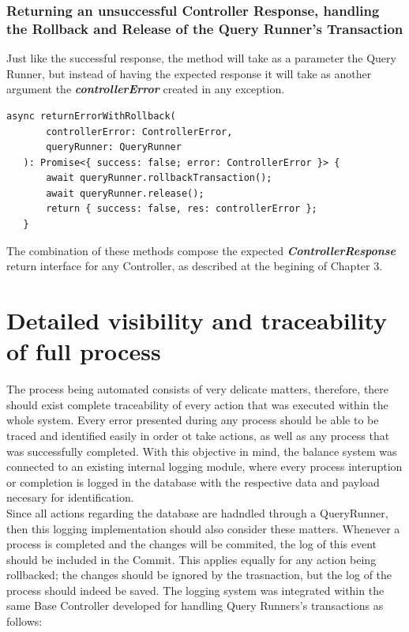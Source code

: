 \subsubsection{Returning an unsuccessful Controller Response, handling the Rollback and Release of the Query Runner's Transaction}


Just like the successful response, the method will take as a parameter the Query Runner, but instead of having the expected response it will take as another argument the \textbf{\textit{controllerError}} created in any exception.

\begin{verbatim}
async returnErrorWithRollback(
       controllerError: ControllerError,
       queryRunner: QueryRunner
   ): Promise<{ success: false; error: ControllerError }> {
       await queryRunner.rollbackTransaction();
       await queryRunner.release();
       return { success: false, res: controllerError };
   }
\end{verbatim}

The combination of these methods compose the expected \textbf{\textit{ControllerResponse}} return interface for any Controller, as described at the begining of Chapter 3.

\section{Detailed visibility and traceability of full process}

The process being automated consists of very delicate matters, therefore, there should exist complete traceability of every action that was executed within the whole system. Every error presented during any process should be able to be traced and identified easily in order ot take actions, as well as any process that was successfully completed. With this objective in mind, the balance system was connected to an existing internal logging module, where every process interuption or completion is logged in the database with the respective data and payload necesary for identification.\\

Since all actions regarding the database are hadndled through a QueryRunner, then this logging implementation should also consider these matters. Whenever a process is completed and the changes will be commited, the log of this event should be included in the Commit. This applies equally for any action being rollbacked; the changes should be ignored by the trasnaction, but the log of the process should indeed be saved. The logging system was integrated within the same Base Controller developed for handling Query Runners's transactions as follows:\\

